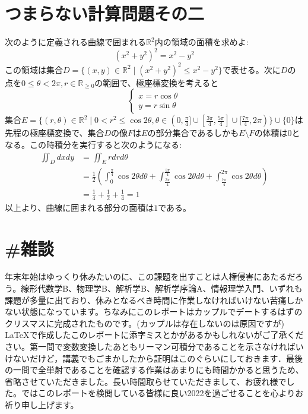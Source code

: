 \documentclass[dvipdfmx]{jreport}
\begin{document}
\section{つまらない計算問題その二}
次のように定義される曲線で囲まれる$\mathbb{R}^2$内の領域の面積を求めよ:
$$
(x^2 +y^2)^2 = x^2 -y^2
$$
この領域は集合$D = \{ (x,y) \in \mathbb{R}^2 \mid (x^2 +y^2)^2 \le x^2 -y^2\}$で表せる。次に$D$の点を$ 0 \le \theta < 2\pi,r\in \mathbb{R}_{\ge 0} $の範囲で、極座標変換を考えると
\begin{equation}
	\begin{cases}
		x=r\cos\theta\\
		y=r\sin \theta
	\end{cases}
\end{equation}
集合$E =\{(r,\theta ) \in \mathbb{R}^2 \mid 0< r^2 \le  \cos 2\theta , \theta \in (0,\frac{\pi}{4} ] \cup [\frac{3\pi}{4},\frac{5\pi}{4}]\cup[\frac{7\pi}{4},2\pi) \}\cup\{0\}$は先程の極座標変換で、集合$D$の像$F$は$E$の部分集合であるしかも$E\setminus F$の体積は0となる。この時積分を実行すると次のようになる:
\begin{equation}
	\begin{aligned}
		\iint_D dxdy &= \iint_E rdrd\theta\\
			     &= \frac{1}{2} \left( \int_0^{\frac{\pi }{4}} \cos2\theta d\theta  
			      +\int_{\frac{3\pi}{4}}^{\frac{5\pi }{4}} \cos2\theta d\theta  
			      +\int_{\frac{7\pi }{4}}^{ 2 \pi } \cos2\theta d\theta  \right)\\
			     &=\frac{1}{4}+\frac{1}{2}+\frac{1}{4}=1
	\end{aligned}
\end{equation}
以上より、曲線に囲まれる部分の面積は$1$である。
\newpage
\section{\#雑談}
年末年始はゆっくり休みたいのに、この課題を出すことは人権侵害にあたるだろう。線形代数学B、物理学B、解析学B、解析学序論A、情報理学入門、いずれも課題が多量に出ており、休みとなるべき時間に作業しなければいけない苦痛しかない状態になっています。ちなみにこのレポートはカップルでデートするはずのクリスマスに完成されたものです。(カップルは存在しないのは原因ですが) \LaTeX で作成したこのレポートに添字ミスとかがあるかもしれないがご了承ください。第一問で変数変換したあともリーマン可積分であることを示さなければいけないだけど，講義でもごまかしたから証明はこのぐらいにしておきます．最後の一問で全単射であることを確認する作業はあまりにも時間かかると思うため、省略させていただきました。長い時間取らせていただきまして、お疲れ様でした。ではこのレポートを検閲している皆様に良い2022を過ごせることを心よりお祈り申し上げます。
\end{document}
